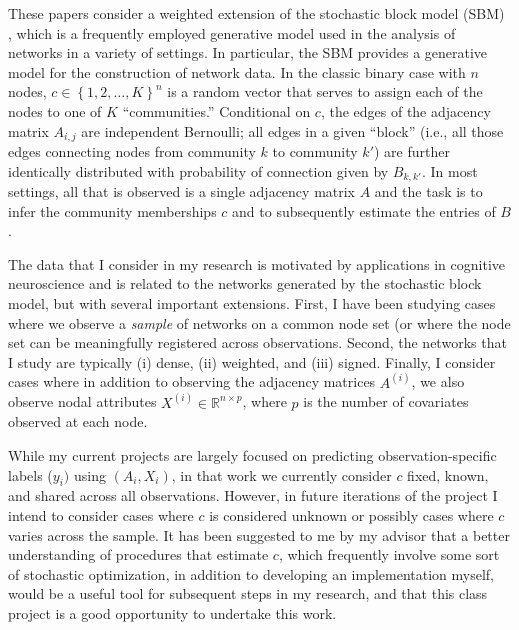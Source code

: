 \documentclass[12pt]{article}   %
\begin{document}
These papers consider a weighted extension of the stochastic block model (SBM) \cite{holland_stochastic_1983}, which is a frequently employed generative model used in the analysis of networks in a variety of settings.
In particular, the SBM provides a generative model for the construction of network data.
In the classic binary case with $n$ nodes, $c \in \left\{ 1, 2, \ldots, K \right\}^n$ is a random vector that serves to assign each of the nodes to one of $K$ ``communities.''
Conditional on $c$, the edges of the adjacency matrix $A_{i,j}$ are independent Bernoulli; all edges in a given ``block'' (i.e., all those edges connecting nodes from community $k$ to community $k'$) are further identically distributed with probability of connection given by $B_{k,k'}$.
In most settings, all that is observed is a single adjacency matrix $A$ and the task is to infer the community memberships $c$ and to subsequently estimate the entries of $B$.

The data that I consider in my research  is motivated by applications in cognitive neuroscience and is related to the networks generated by the stochastic block model, but with several important extensions.
First, I have been studying cases where we observe a \emph{sample} of networks on a common node set (or where the node set can be meaningfully registered across observations.
Second, the networks that I study are typically (i) dense, (ii) weighted, and (iii) signed.
Finally, I consider cases where in addition to observing the adjacency matrices $A^{(i)}$, we also observe nodal attributes $X^{(i)} \in \mathbb{R}^{n \times p}$, where $p$ is the number of covariates observed at each node.

While my current projects are largely focused on predicting observation-specific labels ($y_i)$ using $(A_i,X_i)$, in that work we currently consider $c$ fixed, known, and shared across all observations.
However, in future iterations of the project I intend to consider cases where $c$ is considered unknown or possibly cases where $c$ varies across the sample.
It has been suggested to me by my advisor that a better understanding of procedures that estimate $c$, which frequently involve some sort of stochastic optimization, in addition to developing an implementation myself, would be a useful tool for subsequent steps in my research, and that this class project is a good opportunity to undertake this work.
\end{document}
